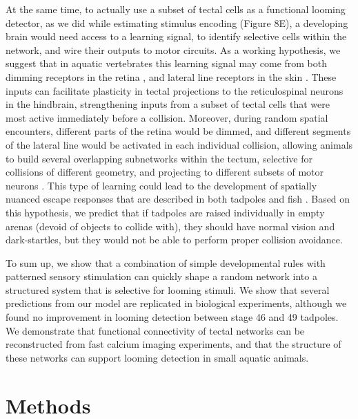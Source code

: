 \documentclass{article}
\begin{document}
At the same time, to actually use a subset of tectal cells as a functional looming detector, as we did while estimating stimulus encoding (Figure 8E), a developing brain would need access to a learning signal, to identify selective cells within the network, and wire their outputs to motor circuits. As a working hypothesis, we suggest that in aquatic vertebrates this learning signal may come from both dimming receptors in the retina \citep{ishikane2005, baranauskas2012, heap2018dimming}, and lateral line receptors in the skin \citep{pratt2009multisens, felch2016, truszkowski2017}. These inputs can facilitate plasticity in tectal projections to the reticulospinal neurons in the hindbrain, strengthening inputs from a subset of tectal cells that were most active immediately before a collision. Moreover, during random spatial encounters, different parts of the retina would be dimmed, and different segments of the lateral line would be activated in each individual collision, allowing animals to build several overlapping subnetworks within the tectum, selective for collisions of different geometry, and projecting to different subsets of motor neurons \citep{frost2004review, barker2015sensorimotor, helmbrecht2018topography}. This type of learning could lead to the development of spatially nuanced escape responses that are described in both tadpoles \citep{khakhalin2014} and fish \citep{bhattacharyya2017assessment}. Based on this hypothesis, we predict that if tadpoles are raised individually in empty arenas (devoid of objects to collide with), they should have normal vision and dark-startles, but they would not be able to perform proper collision avoidance.

To sum up, we show that a combination of simple developmental rules with patterned sensory stimulation can quickly shape a random network into a structured system that is selective for looming stimuli. We show that several predictions from our model are replicated in biological experiments, although we found no improvement in looming detection between stage 46 and 49 tadpoles. We demonstrate that functional connectivity of tectal networks can be reconstructed from fast calcium imaging experiments, and that the structure of these networks can support looming detection in small aquatic animals.

\section*{Methods}

\end{document}
